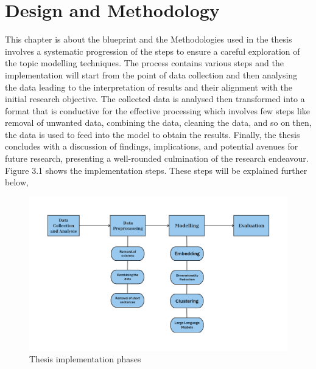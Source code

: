 \chapter{Design and Methodology}

\label{Chapter3}


This chapter is about the blueprint and the Methodologies used in the thesis involves a systematic progression of 
the steps to ensure a careful exploration of the topic modelling techniques. The process contains various steps and the implementation 
will start from the point of data collection and then analysing the data leading to the interpretation of results and their 
alignment with the initial research objective. The collected data is analysed then transformed into a format that is conductive
for the effective processing which involves few steps like removal of unwanted data, combining the data, cleaning the data, and 
so on then, the data is used to feed into the model to obtain the results. Finally, the thesis concludes with a discussion
of findings, implications, and potential avenues for future research, presenting a well-rounded culmination of the research endeavour.
Figure 3.1 shows the implementation steps. These steps will be explained further below,

\begin{figure}[htbp]
    \begin{center}
      \includegraphics[width=15cm]{./Images/Thesis.png}
       \caption{Thesis implementation phases}
       \label{fig: Thesis implementation phases}
    \end{center}
    \end{figure}
